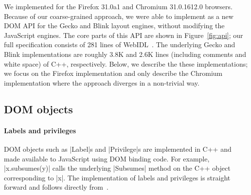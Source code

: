 We implemented \sys{} for the Firefox 31.0a1 and Chromium 31.0.1612.0
browsers.
%
Because of our coarse-grained approach,
we were able to implement \sys{} as a new DOM API for the Gecko and
Blink layout engines, without modifying the JavaScript engines.
%
The core parts of this API are shown in Figure~\ref{fig:api}; our full
specification consists of 281 lines of WebIDL~\cite{webidl}.
%
The underlying Gecko and Blink implementations are roughly 3.8K and
2.6K lines (including comments and white space) of C++, respectively.
%
Below, we describe the these implementations; we focus on the Firefox
implementation and only describe the Chromium implementation where the
approach diverges in a non-trivial way.
%

\subsection{\sys{} DOM objects}

\paragraph{Labels and privileges}
%
DOM objects such as \js|Label|s and \js|Privilege|s are implemented in
C++ and made available to JavaScript using DOM binding code.
%
For example, \js|x.subsumes(y)| calls the underlying \js|Subsumes|
method on the C++ object corresponding to \js|x|.
%
The implementation of labels and privileges is straight forward and
follows directly from~\cite{stefan:2011:dclabels}.


